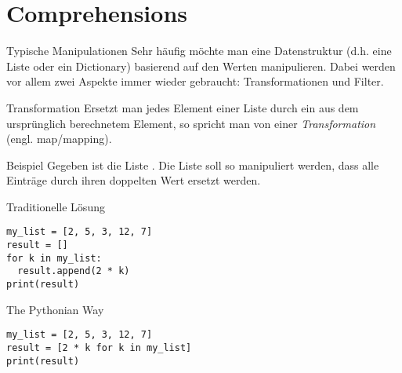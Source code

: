 \section{Comprehensions}

\begin{frame}
\begin{block}{Typische Manipulationen}
\vspace{2pt}
Sehr häufig möchte man eine Datenstruktur (d.h. eine Liste oder ein Dictionary) basierend auf den Werten manipulieren. Dabei werden vor allem zwei Aspekte immer wieder gebraucht: Transformationen und Filter. 
\end{block}

\end{frame}

\begin{frame}
\begin{block}{Transformation}
\vspace{2pt}
Ersetzt man jedes Element einer Liste durch ein aus dem ursprünglich berechnetem Element, so spricht man von einer \emph{Transformation} (engl. map/mapping). 
\end{block}

\pause 

\vspace{12pt}

\begin{exampleblock}{Beispiel}
\vspace{2pt}
Gegeben ist die Liste . Die Liste soll so manipuliert werden, dass alle Einträge durch ihren doppelten Wert ersetzt werden. 
\end{exampleblock}

\end{frame}

\begin{fragile}
\begin{overprint}

\begin{block}{Traditionelle Lösung}
\vspace{2pt}
\begin{verbatim}
my_list = [2, 5, 3, 12, 7]
result = []
for k in my_list: 
  result.append(2 * k)
print(result)
\end{verbatim}
\end{block}

\vspace{12pt}

\pause

\begin{block}{The Pythonian Way}
\vspace{2pt}
\begin{verbatim}
my_list = [2, 5, 3, 12, 7]
result = [2 * k for k in my_list]
print(result)
\end{verbatim}
\end{block}
\end{overprint}
\end{fragile}



